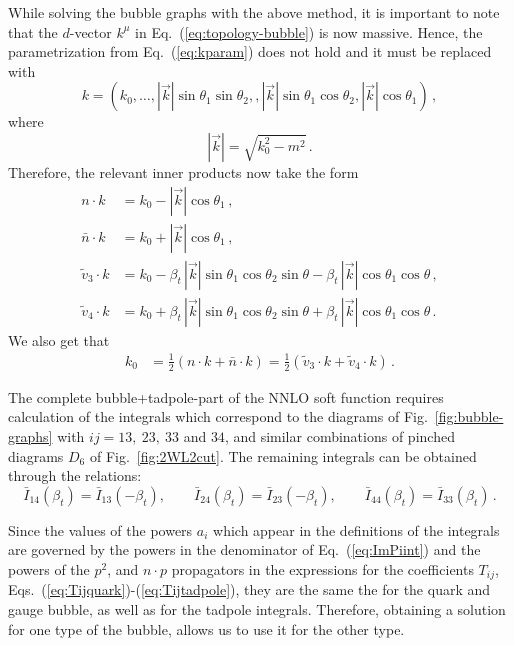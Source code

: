 \documentclass[a4paper,11pt]{article}
\newcommand{\nbar}{\ensuremath{\bar{n}}}
\numberwithin{equation}{section}
\begin{document}
%
While solving the bubble graphs with the above method, it is important to note
that the $d$-vector $k^\mu$ in Eq.~(\ref{eq:topology-bubble}) is now massive.
Hence, the parametrization from Eq.~(\ref{eq:kparam}) does not hold
and it must be replaced with 
%
\begin{equation}
 k  = 
 (k_0, \ldots,
 |\vec k| \sin\theta_1\sin\theta_2, ,|\vec k| \sin\theta_1\cos\theta_2,
 |\vec k| \cos\theta_1)\,,
 \label{eq:k4v-par-massive}
\end{equation}
%
where
%
\begin{equation}
 |\vec k| = \sqrt{k_0^2-m^2}\,.
\end{equation}
%
Therefore, the relevant inner products now take the form
%
\begin{align}
  n \cdot k & =  k_0 - |\vec k| \cos\theta_1\,, \\
  \nbar \cdot k & =  k_0 + |\vec k| \cos\theta_1\,, \\
  \tilde v_3 \cdot k & =  k_0- 
  \beta_t\, |\vec k| \sin\theta_1\cos\theta_2\sin\theta -
  \beta_t\, |\vec k| \cos\theta_1\cos\theta\,, \\
  \tilde v_4 \cdot k & =  k_0+
  \beta_t\, |\vec k|\sin\theta_1\cos\theta_2\sin\theta +
  \beta_t\, |\vec k|\cos\theta_1\cos\theta\,.
\end{align}
%
We also get that
%
\begin{align}
 k_0 & = \frac12\left(n\cdot k + \nbar \cdot k\right) 
 = \frac12\left(\tilde v_3\cdot k + \tilde v_4 \cdot k\right)\,.
\end{align}

The complete bubble+tadpole-part of the NNLO soft function requires calculation
of the integrals which correspond to the diagrams of
Fig.~\ref{fig:bubble-graphs} with $ij = 13,\ 23,\ 33$ and $34$, and similar
combinations of pinched diagrams $D_6$ of Fig.~\ref{fig:2WL2cut}. 
%
The remaining integrals can be obtained through the relations:
\begin{equation}
  \bar I_{14}(\beta_t) = \bar I_{13}(-\beta_t), \qquad 
  \bar I_{24}(\beta_t) = \bar I_{23}(-\beta_t), \qquad
  \bar I_{44}(\beta_t) = \bar I_{33}(\beta_t)\,. 
\end{equation}

Since the values of the powers $a_i$ which
appear in the definitions of the integrals are governed by the powers in
the denominator of Eq.~(\ref{eq:ImPiint}) and the powers of the $p^2$, and
$n\cdot p$ propagators in the expressions for the coefficients $T_{ij}$,
Eqs.~(\ref{eq:Tijquark})-(\ref{eq:Tijtadpole}), they are the same the for the
quark and gauge bubble, as well as for the tadpole integrals.
%
Therefore, obtaining a solution for one type of the bubble, allows us to use it
for the other type.
\end{document}
